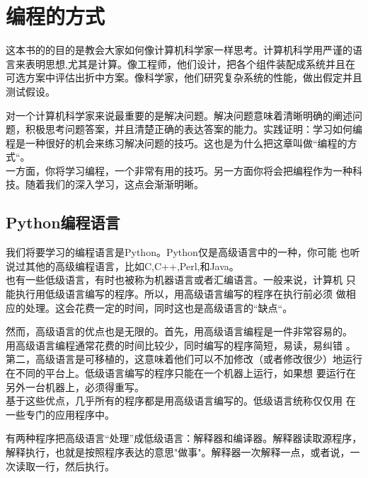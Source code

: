 \documentclass[10pt]{book}
\begin{document}
\mainmatter

\chapter{编程的方式}

这本书的的目的是教会大家如何像计算机科学家一样思考。计算机科学用严谨的语言来表明思想,尤其是计算。像工程师，他们设计，把各个组件装配成系统并且在可选方案中评估出折中方案。像科学家，他们研究复杂系统的性能，做出假定并且测试假设。



对一个计算机科学家来说最重要的是解决问题。解决问题意味着清晰明确的阐述问题，积极思考问题答案，并且清楚正确的表达答案的能力。实践证明：学习如何编程是一种很好的机会来练习解决问题的技巧。这也是为什么把这章叫做“编程的方式“。\\

一方面，你将学习编程，一个非常有用的技巧。另一方面你将会把编程作为一种科技。随着我们的深入学习，这点会渐渐明晰。

\section{Python编程语言}

我们将要学习的编程语言是Python。Python仅是高级语言中的一种，你可能
也听说过其他的高级编程语言，比如C,C++,Perl,和Java。\\

也有一些低级语言，有时也被称为机器语言或者汇编语言。一般来说，计算机
只能执行用低级语言编写的程序。所以，用高级语言编写的程序在执行前必须
做相应的处理。这会花费一定的时间，同时这也是高级语言的“缺点“。\\


然而，高级语言的优点也是无限的。首先，用高级语言编程是一件非常容易的。
用高级语言编程通常花费的时间比较少，同时编写的程序简短，易读，易纠错
。第二，高级语言是可移植的，这意味着他们可以不加修改（或者修改很少）地运行在不同的平台上。低级语言编写的程序只能在一个机器上运行，如果想
要运行在另外一台机器上，必须得重写。\\

基于这些优点，几乎所有的程序都是用高级语言编写的。低级语言统称仅仅用
在一些专门的应用程序中。


有两种程序把高级语言“处理”成低级语言：解释器和编译器。解释器读取源程序，解释执行，也就是按照程序表达的意思"做事"。解释器一次解释一点，或者说，一次读取一行，然后执行。\\
\end{document}
